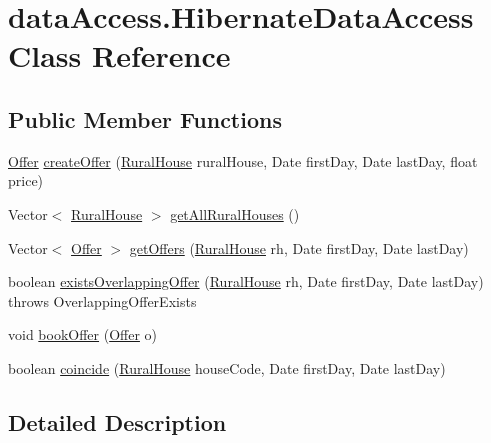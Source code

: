 \hypertarget{classdataAccess_1_1HibernateDataAccess}{}\section{data\+Access.\+Hibernate\+Data\+Access Class Reference}
\label{classdataAccess_1_1HibernateDataAccess}
\subsection*{Public Member Functions}
\begin{DoxyCompactItemize}
\item 
\mbox{\hyperlink{classdomain_1_1Offer}{Offer}} \mbox{\hyperlink{classdataAccess_1_1HibernateDataAccess_a2d226cc2032db6a4522fc6e172315480}{create\+Offer}} (\mbox{\hyperlink{classdomain_1_1RuralHouse}{Rural\+House}} rural\+House, Date first\+Day, Date last\+Day, float price)
\item 
Vector$<$ \mbox{\hyperlink{classdomain_1_1RuralHouse}{Rural\+House}} $>$ \mbox{\hyperlink{classdataAccess_1_1HibernateDataAccess_a3e70561f64924c0a6c5a1edfbc5528da}{get\+All\+Rural\+Houses}} ()
\item 
Vector$<$ \mbox{\hyperlink{classdomain_1_1Offer}{Offer}} $>$ \mbox{\hyperlink{classdataAccess_1_1HibernateDataAccess_a60f1f7e00fb7ccec7fbb799e8a302295}{get\+Offers}} (\mbox{\hyperlink{classdomain_1_1RuralHouse}{Rural\+House}} rh, Date first\+Day, Date last\+Day)
\item 
boolean \mbox{\hyperlink{classdataAccess_1_1HibernateDataAccess_aae72706f749c3cb823d6002f979835c7}{exists\+Overlapping\+Offer}} (\mbox{\hyperlink{classdomain_1_1RuralHouse}{Rural\+House}} rh, Date first\+Day, Date last\+Day)  throws Overlapping\+Offer\+Exists  	
\item 
void \mbox{\hyperlink{classdataAccess_1_1HibernateDataAccess_a16a54ece6133abc98eae6b61daa9d4db}{book\+Offer}} (\mbox{\hyperlink{classdomain_1_1Offer}{Offer}} o)
\item 
boolean \mbox{\hyperlink{classdataAccess_1_1HibernateDataAccess_a20de01b8c85e851ca310123cb7e6037d}{coincide}} (\mbox{\hyperlink{classdomain_1_1RuralHouse}{Rural\+House}} house\+Code, Date first\+Day, Date last\+Day)
\end{DoxyCompactItemize}


\subsection{Detailed Description}


